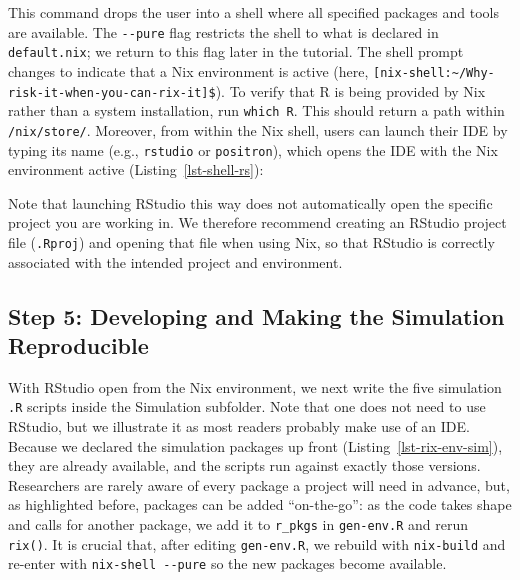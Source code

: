 \documentclass[
  man,
  longtable,
  nolmodern,
  notxfonts,
  notimes,
  colorlinks=true,linkcolor=blue,citecolor=blue,urlcolor=blue]{apa7}
\newenvironment{Shaded}{\begin{snugshade}}{\end{snugshade}}
\newcommand{\ExtensionTok}[1]{\textcolor[rgb]{0.00,0.23,0.31}{#1}}
\newcommand{\NormalTok}[1]{\textcolor[rgb]{0.00,0.23,0.31}{#1}}
\begin{document}
This command drops the user into a shell where all specified packages
and tools are available. The \texttt{-\/-pure} flag restricts the shell
to what is declared in \texttt{default.nix}; we return to this flag
later in the tutorial. The shell prompt changes to indicate that a Nix
environment is active (here,
\texttt{{[}nix-shell:\textasciitilde{}/Why-risk-it-when-you-can-rix-it{]}\$}).
To verify that R is being provided by Nix rather than a system
installation, run \texttt{which\ R}. This should return a path within
\texttt{/nix/store/}. Moreover, from within the Nix shell, users can
launch their IDE by typing its name (e.g., \texttt{rstudio} or
\texttt{positron}), which opens the IDE with the Nix environment active
(Listing~\ref{lst-shell-rs}):

\begin{codelisting}

\caption{\label{lst-shell-rs}Activating RStudio \normalsize}

\centering{

\small

\begin{Shaded}
\begin{Highlighting}[]
\ExtensionTok{[nix{-}shell:\textasciitilde{}/Why{-}risk{-}it{-}when{-}you{-}can{-}rix{-}it]$}\NormalTok{ rstudio}
\end{Highlighting}
\end{Shaded}

}

\end{codelisting}%

Note that launching RStudio this way does not automatically open the
specific project you are working in. We therefore recommend creating an
RStudio project file (\texttt{.Rproj}) and opening that file when using
Nix, so that RStudio is correctly associated with the intended project
and environment.

\subsection{Step 5: Developing and Making the Simulation
Reproducible}\label{step-5-developing-and-making-the-simulation-reproducible}

With RStudio open from the Nix environment, we next write the five
simulation \texttt{.R} scripts inside the Simulation subfolder. Note
that one does not need to use RStudio, but we illustrate it as most
readers probably make use of an IDE. Because we declared the simulation
packages up front (Listing~\ref{lst-rix-env-sim}), they are already
available, and the scripts run against exactly those versions.
Researchers are rarely aware of every package a project will need in
advance, but, as highlighted before, packages can be added
``on-the-go'': as the code takes shape and calls for another package, we
add it to \texttt{r\_pkgs} in \texttt{gen-env.R} and rerun
\texttt{rix()}. It is crucial that, after editing \texttt{gen-env.R}, we
rebuild with \texttt{nix-build} and re-enter with
\texttt{nix-shell\ -\/-pure} so the new packages become available.
\end{document}
